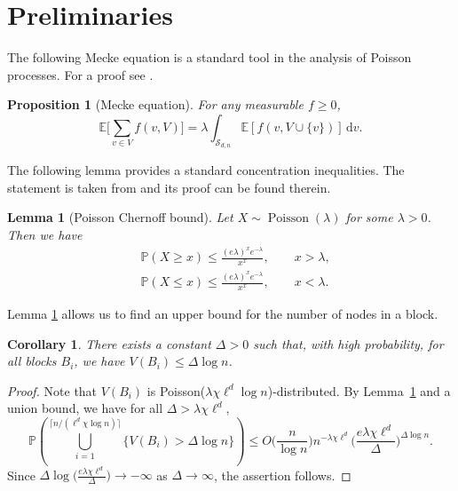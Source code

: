 \documentclass[11pt, a4paper]{amsart}
\newtheorem{lemma}[theorem]{Lemma}
\newtheorem{corollary}[theorem]{Corollary}
\renewcommand{\P}{\mathbb{P}}
\newcommand{\E}{\mathbb{E}}
\newcommand{\1}{\mathbf{1}}
\newtheorem{proposition}[theorem]{Proposition}
\theoremstyle{definition}
\theoremstyle{remark}
\theoremstyle{definition}
\begin{document}
\section{Preliminaries}
\label{app: appendix}

The following Mecke equation is a standard tool in the analysis of Poisson processes. For a proof see \cite[Theorem 4.1]{lp}.

\begin{proposition}[Mecke equation] \label{thm:mecke}
    For any measurable $f\ge 0$,
    \begin{equation}  
    \E \Big[\sum _{v \in V} f(v,V)\Big] = \lambda \int_{\mathcal S_{d,n}} \E[ f(v,V\cup \{v\})]
\,\mathrm d v.
\end{equation}
\end{proposition}

The following lemma provides a standard concentration inequalities. The statement is taken from \cite{mitzenmacher} and its proof can be found therein. 



\begin{lemma}[Poisson Chernoff bound]
\label{lemma:poisson_concentration}
Let $X\sim \operatorname{Poisson}(\lambda)$ for some $\lambda>0$. Then we have
\begin{align*}
    &\P(X  \ge x) \le \frac{(e \lambda)^x e^{-\lambda}}{x^x},\qquad x > \lambda,\\
    &\P(X  \le x) \le \frac{(e \lambda)^x e^{-\lambda}}{x^x},\qquad x < \lambda.
\end{align*}
\end{lemma}

Lemma \ref{lemma:poisson_concentration} allows us to find an upper bound for the number of nodes in a block.


\begin{corollary}\label{cor:poisson_upper_concentration}
    There exists a constant $\Delta > 0$ such that, with high probability, for all blocks $B_i$, we have $V(B_i) \leq \Delta \log n$.
\end{corollary}
\begin{proof}
    Note that $V(B_i)$ is Poisson($\lambda \chi \ell^d \log n$)-distributed. By Lemma~\ref{lemma:poisson_concentration} and a union bound, we have for all $\Delta>\lambda \chi \ell^d$, 
    $$
    \mathbb P\left(\bigcup_{i=1}^{\lceil n/(\ell^d \chi \log n)\rceil}  \{V(B_i) > \Delta \log n\}\right) \le 
    O\Big(\frac{n}{\log n}\Big) n^{- \lambda \chi \ell^d} \Big(\frac{e \lambda \chi \ell^d}{\Delta} \Big)^{\Delta \log n}.
    $$
    Since $\Delta \log\Big(\frac{e \lambda \chi \ell^d}{\Delta} \Big) \to -\infty$ as $\Delta \to \infty$, the assertion follows.
\end{proof}
\end{document}
